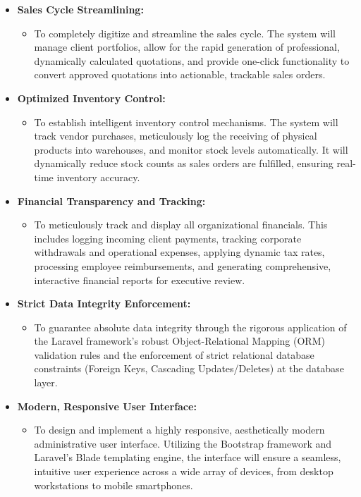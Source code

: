 ﻿\documentclass[12pt,a4paper]{report}
\begin{document}
\begin{itemize}
\item \textbf{Sales Cycle Streamlining:}
    \begin{itemize}
        \item To completely digitize and streamline the sales cycle. The system will manage client portfolios, allow for the rapid generation of professional, dynamically calculated quotations, and provide one-click functionality to convert approved quotations into actionable, trackable sales orders.
    \end{itemize}
\item \textbf{Optimized Inventory Control:}
    \begin{itemize}
        \item To establish intelligent inventory control mechanisms. The system will track vendor purchases, meticulously log the receiving of physical products into warehouses, and monitor stock levels automatically. It will dynamically reduce stock counts as sales orders are fulfilled, ensuring real-time inventory accuracy.
    \end{itemize}
\item \textbf{Financial Transparency and Tracking:}
    \begin{itemize}
        \item To meticulously track and display all organizational financials. This includes logging incoming client payments, tracking corporate withdrawals and operational expenses, applying dynamic tax rates, processing employee reimbursements, and generating comprehensive, interactive financial reports for executive review.
    \end{itemize}
\item \textbf{Strict Data Integrity Enforcement:}
    \begin{itemize}
        \item To guarantee absolute data integrity through the rigorous application of the Laravel framework's robust Object-Relational Mapping (ORM) validation rules and the enforcement of strict relational database constraints (Foreign Keys, Cascading Updates/Deletes) at the database layer.
    \end{itemize}
\item \textbf{Modern, Responsive User Interface:}
    \begin{itemize}
        \item To design and implement a highly responsive, aesthetically modern administrative user interface. Utilizing the Bootstrap framework and Laravel's Blade templating engine, the interface will ensure a seamless, intuitive user experience across a wide array of devices, from desktop workstations to mobile smartphones.

\end{itemize}
\end{itemize}
\end{document}
